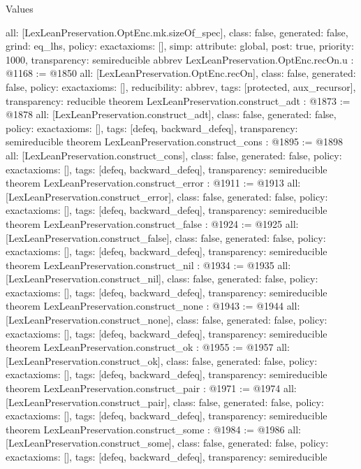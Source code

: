 \begin{lexlean}{Values}
\begin{coremodule}
{  all: [LexLeanPreservation.OptEnc.mk.sizeOf_spec],
  class: false,
  generated: false,
  grind: eq_lhs,
  policy: exact{axioms: []},
  simp: {attribute: global, post: true, priority: 1000},
  transparency: semireducible
}
abbrev LexLeanPreservation.OptEnc.recOn.{u} : @1168 := @1850 {
  all: [LexLeanPreservation.OptEnc.recOn],
  class: false,
  generated: false,
  policy: exact{axioms: []},
  reducibility: abbrev{},
  tags: [protected, aux_recursor],
  transparency: reducible
}
theorem LexLeanPreservation.construct_adt : @1873 := @1878 {
  all: [LexLeanPreservation.construct_adt],
  class: false,
  generated: false,
  policy: exact{axioms: []},
  tags: [defeq, backward_defeq],
  transparency: semireducible
}
theorem LexLeanPreservation.construct_cons : @1895 := @1898 {
  all: [LexLeanPreservation.construct_cons],
  class: false,
  generated: false,
  policy: exact{axioms: []},
  tags: [defeq, backward_defeq],
  transparency: semireducible
}
theorem LexLeanPreservation.construct_error : @1911 := @1913 {
  all: [LexLeanPreservation.construct_error],
  class: false,
  generated: false,
  policy: exact{axioms: []},
  tags: [defeq, backward_defeq],
  transparency: semireducible
}
theorem LexLeanPreservation.construct_false : @1924 := @1925 {
  all: [LexLeanPreservation.construct_false],
  class: false,
  generated: false,
  policy: exact{axioms: []},
  tags: [defeq, backward_defeq],
  transparency: semireducible
}
theorem LexLeanPreservation.construct_nil : @1934 := @1935 {
  all: [LexLeanPreservation.construct_nil],
  class: false,
  generated: false,
  policy: exact{axioms: []},
  tags: [defeq, backward_defeq],
  transparency: semireducible
}
theorem LexLeanPreservation.construct_none : @1943 := @1944 {
  all: [LexLeanPreservation.construct_none],
  class: false,
  generated: false,
  policy: exact{axioms: []},
  tags: [defeq, backward_defeq],
  transparency: semireducible
}
theorem LexLeanPreservation.construct_ok : @1955 := @1957 {
  all: [LexLeanPreservation.construct_ok],
  class: false,
  generated: false,
  policy: exact{axioms: []},
  tags: [defeq, backward_defeq],
  transparency: semireducible
}
theorem LexLeanPreservation.construct_pair : @1971 := @1974 {
  all: [LexLeanPreservation.construct_pair],
  class: false,
  generated: false,
  policy: exact{axioms: []},
  tags: [defeq, backward_defeq],
  transparency: semireducible
}
theorem LexLeanPreservation.construct_some : @1984 := @1986 {
  all: [LexLeanPreservation.construct_some],
  class: false,
  generated: false,
  policy: exact{axioms: []},
  tags: [defeq, backward_defeq],
  transparency: semireducible
}
\end{coremodule}
\end{lexlean}
